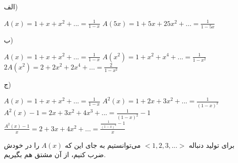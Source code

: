 \p
الف)\begin{center}
			    
			$ A(x) = 1 + x + x^2 + ... = \frac{1}{1 - x} $
			\medbreak
			$ A(5x) = 1 + 5x + 25x^2 + ... = \frac{1}{1 - 5x} $
			\end{center} 
			
			ب) \begin{center}
			$ A(x) = 1 + x + x^2 + ... = \frac{1}{1 - x} $ \medbreak
			$ A(x^2) = 1 + x^2 + x^4 + ... = \frac{1}{1 - x^2} $ \medbreak
			$ 2A(x^2) = 2 + 2x^2 + 2x^4 + ... = \frac{2}{1 - x^2}$ \medbreak
			\end{center}
			
			ج) \begin{center}
	        $ A(x) = 1 + x + x^2 + ... = \frac{1}{1 - x} $ \medbreak
			$ A^2(x) = 1 + 2x + 3x^2 + ... = \frac{1}{(1 - x)^2}$ \medbreak
			$ A^2(x) - 1 = 2x + 3x^2 + 4x^3 + ... = \frac{1}{(1 - x)^2} - 1$\medbreak
			$ \frac{A^2(x) - 1}{x} = 2 + 3x + 4x^2 + ... = \frac{\frac{1}{(1 - x)^2} - 1}{x}$
			\end{center} 
		    برای تولید دنباله 
		    $<1, 2, 3, ...>$
		    می‌توانستیم به جای این که $A(x)$ را در خودش ضرب کنیم، از آن مشتق هم بگیریم.